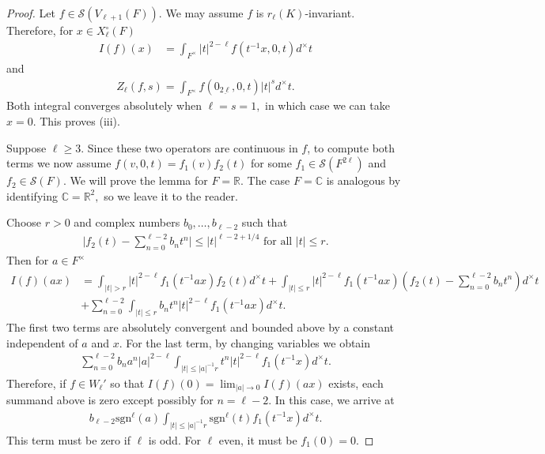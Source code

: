 \documentclass[10pt,a4paper]{amsart}
\newcommand{\CC}{\mathbb{C}}
\newcommand{\RR}{\mathbb{R}}
\begin{document}
\begin{proof}
    Let $f\in \mathcal{S}(V_{\ell+1}(F)).$ We may assume $f$ is $r_\ell(K)$-invariant. Therefore, for $x\in X_\ell^\circ(F)$
    \begin{align*}
        I(f)(x)&=\int_{F^\times} |t|^{2-\ell} f(t^{-1}x,0,t)d^\times t
    \end{align*}
    and 
    \begin{align*}
        Z_\ell(f,s)=\int_{F^\times} f(0_{\underline{2\ell}},0,t)|t|^sd^\times t.
    \end{align*}
    Both integral converges absolutely when $\ell=s=1,$ in which case we can take $x=0$. This proves (iii).
    
   Suppose $\ell\ge 3$. Since these two operators are continuous in $f$, to compute both terms we now assume $f(v,0,t)=f_1(v)f_2(t)$ for some $f_1\in \mathcal{S}(F^{2\ell})$ and  $f_2\in \mathcal{S}(F)$.  We will prove the lemma for $F=\RR.$ The case $F=\CC$ is analogous by identifying $\CC=\RR^2,$ so we leave it to the reader. 
   
    Choose $r>0$ and complex numbers $b_0,\ldots, b_{\ell-2}$ such that 
   \begin{align*}
       \bigg|f_2(t)-\sum_{n=0}^{\ell-2}b_nt^n\bigg|\le |t|^{\ell-2+1/4} \textrm{ for all } |t|\le r. 
   \end{align*}
   Then for $a\in F^\times$
   \begin{align*}
       I(f)(ax)&=\int_{|t|>r} |t|^{2-\ell}f_1(t^{-1}ax)f_2(t) d^\times t+\int_{|t|\le r} |t|^{2-\ell}f_1(t^{-1}ax)\left(f_2(t)-\sum_{n=0}^{\ell-2} b_nt^n\right) d^\times t\\
       &+\sum_{n=0}^{\ell-2}\int_{|t|\le r} b_nt^n|t|^{2-\ell} f_1(t^{-1}ax)d^\times t.
   \end{align*}
   The first two terms are absolutely convergent and bounded above by a constant independent of $a$ and $x$. For the last term, by changing variables we obtain
   \begin{align*}
       \sum_{n=0}^{\ell-2} b_n a^n|a|^{2-\ell}\int_{|t|\le |a|^{-1}r}t^n|t|^{2-\ell} f_1(t^{-1}x)d^\times t.
   \end{align*}
    Therefore, if $f\in W_\ell'$ so that $I(f)(0)=\lim_{|a|\to 0}I(f)(ax)$ exists, each summand above is zero except possibly for $n=\ell-2$. In this case, we arrive at
    \begin{align*}
        b_{\ell-2}\mathrm{sgn}^{\ell}(a)\int_{|t|\le |a|^{-1}r} \mathrm{sgn}^\ell(t)f_1(t^{-1} x)d^\times  t.
    \end{align*}
    This term must be zero if $\ell$ is odd. For $\ell$ even, it must be $f_1(0)=0.$ 
    

\end{proof}
\end{document}
